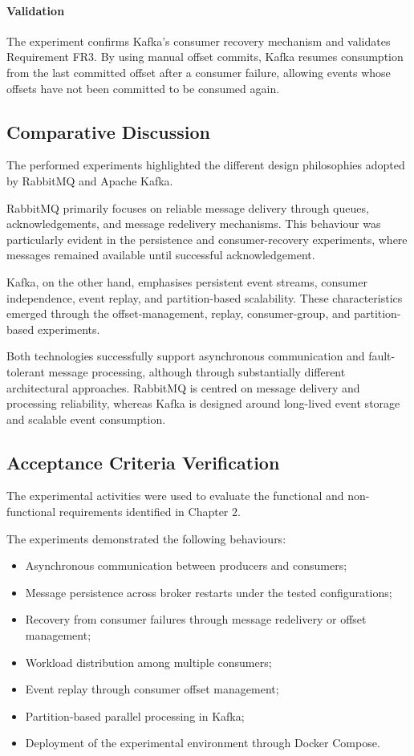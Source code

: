 \documentclass{scrartcl}
\begin{document}
\paragraph{Validation}

The experiment confirms Kafka’s consumer recovery mechanism and validates Requirement FR3. By using manual offset commits, Kafka resumes consumption from the last committed offset after a consumer failure, allowing events whose offsets have not been committed to be consumed again.

\subsection{Comparative Discussion}

The performed experiments highlighted the different design philosophies adopted by RabbitMQ and Apache Kafka.

RabbitMQ primarily focuses on reliable message delivery through queues, acknowledgements, and message redelivery mechanisms. This behaviour was particularly evident in the persistence and consumer-recovery experiments, where messages remained available until successful acknowledgement.

Kafka, on the other hand, emphasises persistent event streams, consumer independence, event replay, and partition-based scalability. These characteristics emerged through the offset-management, replay, consumer-group, and partition-based experiments.

Both technologies successfully support asynchronous communication and fault-tolerant message processing, although through substantially different architectural approaches. RabbitMQ is centred on message delivery and processing reliability, whereas Kafka is designed around long-lived event storage and scalable event consumption.

\subsection{Acceptance Criteria Verification}

The experimental activities were used to evaluate the functional and non-functional requirements identified in Chapter 2.

The experiments demonstrated the following behaviours:

\begin{itemize}
\item Asynchronous communication between producers and consumers;
\item Message persistence across broker restarts under the tested configurations;
\item Recovery from consumer failures through message redelivery or offset management;
\item Workload distribution among multiple consumers;
\item Event replay through consumer offset management;
\item Partition-based parallel processing in Kafka;
\item Deployment of the experimental environment through Docker Compose.
\end{itemize}
\end{document}
